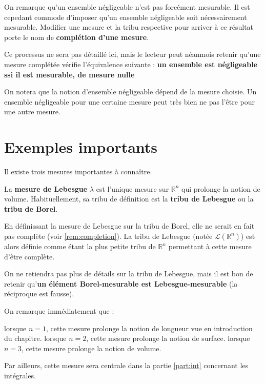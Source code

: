 \documentclass[../integ-proba.tex]{subfiles}
\begin{document}
\begin{rem}
  \label{rem:completion}
  On remarque qu'un ensemble négligeable n'est pas forcément mesurable.
  Il est cepedant commode d'imposer qu'un ensemble négligeable soit nécessairement mesurable.
  Modifier une mesure et la tribu respective pour arriver à ce résultat porte le nom de \textbf{complétion d'une mesure}.

  Ce processus ne sera pas détaillé ici, mais le lecteur peut néanmois retenir qu'une mesure complétée vérifie l'équivalence suivante : \textbf{un ensemble est négligeable ssi il est mesurable, de mesure nulle}
\end{rem}

\begin{rem}
  On notera que la notion d'ensemble négligeable dépend de la mesure choisie.
  Un ensemble négligeable pour une certaine mesure peut très bien ne pas l'être pour une autre mesure.
\end{rem}


\section{Exemples importants}
Il existe trois mesures importantes à connaître.

\begin{defi}
  La \textbf{mesure de Lebesgue} $\lambda$ est l'unique mesure sur $\mathbb{R}^n$ qui prolonge la notion de volume.
  Habituellement, sa tribu de définition est la \textbf{tribu de Lebesgue} ou la \textbf{tribu de Borel}.
\end{defi}

\begin{rem}
  En définissant la mesure de Lebesgue sur la tribu de Borel, elle ne serait en fait pas complète (voir \ref{rem:completion}).
  La tribu de Lebesgue (notée $\mathcal{L}(\mathbb{R}^n)$) est alors définie comme étant la plus petite tribu de $\mathbb{R}^n$ permettant à cette mesure d'être complète.
  
  On ne retiendra pas plus de détails sur la tribu de Lebesgue, mais il est bon de retenir qu'\textbf{un élément Borel-mesurable est Lebesgue-mesurable} (la réciproque est fausse).
\end{rem}

\begin{rem}
  On remarque immédiatement que :
  \begin{itemize}
    \itemb lorsque $n=1$, cette mesure prolonge la notion de longueur vue en introduction du chapitre.
    \itemb lorsque $n=2$, cette mesure prolonge la notion de surface.
    \itemb lorsque $n=3$, cette mesure prolonge la notion de volume.
  \end{itemize}

  Par ailleurs, cette mesure sera centrale dans la partie \ref{part:int} concernant les intégrales.
\end{rem}
\end{document}
